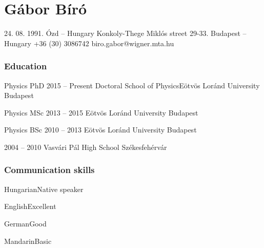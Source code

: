 \documentclass{tccv}
\begin{document}
\part{Gábor Bíró}

\personal
    {24. 08. 1991. Ózd -- Hungary}
    {Konkoly-Thege Miklós street 29-33. Budapest -- Hungary}
    {+36 (30) 3086742}
    {biro.gabor@wigner.mta.hu}

%
%
%

\section{Education}

\begin{yearlist}

\item[Physics PhD]{2015 -- Present}
     {Doctoral School of Physics\newline Eötvös Loránd University}
     {Budapest}

\item[Physics MSc]{2013 -- 2015}
     {Eötvös Loránd University}
     {Budapest}

\item[Physics BSc]{2010 -- 2013}
     {Eötvös Loránd University}
     {Budapest}

\item{2004 -- 2010}
     {Vasvári Pál High School}
     {Székesfehérvár}

\end{yearlist}

%
%
%

\section{Communication skills}

\begin{factlist}
\item{Hungarian}{Native speaker}
\item{English}{Excellent}
\item{German}{Good}
\item{Mandarin}{Basic}
\end{factlist}
\end{document}
